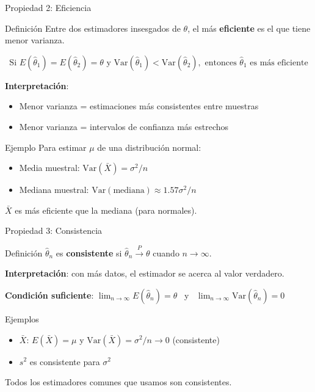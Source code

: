 \documentclass[aspectratio=169, 11pt]{beamer}
\begin{document}
\begin{frame}{Propiedad 2: Eficiencia}
\begin{block}{Definición}
Entre dos estimadores insesgados de $\theta$, el más \textbf{eficiente} es el que tiene menor varianza.
\end{block}

\[
\text{Si } E(\hat{\theta}_1) = E(\hat{\theta}_2) = \theta \text{ y } \text{Var}(\hat{\theta}_1) < \text{Var}(\hat{\theta}_2), \text{ entonces } \hat{\theta}_1 \text{ es más eficiente}
\]

\vspace{0.3em}
\textbf{Interpretaci\'on}:
\begin{itemize}
\item Menor varianza = estimaciones m\'as consistentes entre muestras
\item Menor varianza = intervalos de confianza m\'as estrechos
\end{itemize}

\vspace{0.3em}
\begin{exampleblock}{Ejemplo}
Para estimar $\mu$ de una distribuci\'on normal:
\begin{itemize}
\item Media muestral: $\text{Var}(\bar{X}) = \sigma^2/n$
\item Mediana muestral: $\text{Var}(\text{mediana}) \approx 1.57 \sigma^2/n$
\end{itemize}
$\bar{X}$ es más eficiente que la mediana (para normales).
\end{exampleblock}
\end{frame}

\begin{frame}{Propiedad 3: Consistencia}
\begin{block}{Definición}
$\hat{\theta}_n$ es \textbf{consistente} si
$\hat{\theta}_n \xrightarrow{P} \theta$ cuando $n \to \infty$.
\end{block}

\textbf{Interpretación}: con más datos, el estimador se acerca al valor verdadero.

\textbf{Condición suficiente}: $\lim_{n \to \infty} E(\hat{\theta}_n) = \theta$ \ y \ $\lim_{n \to \infty} \text{Var}(\hat{\theta}_n) = 0$

\begin{exampleblock}{Ejemplos}
\begin{itemize}
\item $\bar{X}$: $E(\bar{X}) = \mu$ y $\text{Var}(\bar{X}) = \sigma^2/n \to 0$ \quad (consistente)
\item $s^2$ es consistente para $\sigma^2$
\end{itemize}
\end{exampleblock}

\alert{Todos los estimadores comunes que usamos son consistentes.}
\end{frame}
\end{document}
